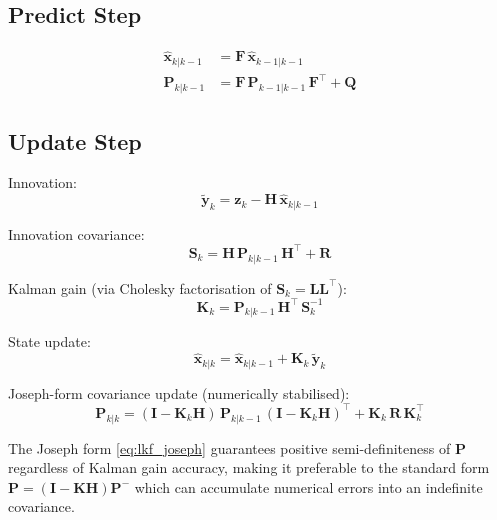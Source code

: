 \documentclass[12pt, a4paper]{article}
\begin{document}
\subsection{Predict Step}

\begin{align}
\hat{\mathbf{x}}_{k|k-1} &= \mathbf{F}\,\hat{\mathbf{x}}_{k-1|k-1} \label{eq:lkf_pred_x}\\
\mathbf{P}_{k|k-1} &= \mathbf{F}\,\mathbf{P}_{k-1|k-1}\,\mathbf{F}^\top + \mathbf{Q} \label{eq:lkf_pred_P}
\end{align}

\subsection{Update Step}

Innovation:
\begin{equation}
\tilde{\mathbf{y}}_k = \mathbf{z}_k - \mathbf{H}\,\hat{\mathbf{x}}_{k|k-1}
\label{eq:lkf_innov}
\end{equation}

Innovation covariance:
\begin{equation}
\mathbf{S}_k = \mathbf{H}\,\mathbf{P}_{k|k-1}\,\mathbf{H}^\top + \mathbf{R}
\label{eq:lkf_S}
\end{equation}

Kalman gain (via Cholesky factorisation of $\mathbf{S}_k = \mathbf{L}\mathbf{L}^\top$):
\begin{equation}
\mathbf{K}_k = \mathbf{P}_{k|k-1}\,\mathbf{H}^\top\,\mathbf{S}_k^{-1}
\label{eq:lkf_K}
\end{equation}

State update:
\begin{equation}
\hat{\mathbf{x}}_{k|k} = \hat{\mathbf{x}}_{k|k-1} + \mathbf{K}_k\,\tilde{\mathbf{y}}_k
\label{eq:lkf_update_x}
\end{equation}

Joseph-form covariance update (numerically stabilised):
\begin{equation}
\mathbf{P}_{k|k} = (\mathbf{I} - \mathbf{K}_k\mathbf{H})\,\mathbf{P}_{k|k-1}\,(\mathbf{I} - \mathbf{K}_k\mathbf{H})^\top + \mathbf{K}_k\,\mathbf{R}\,\mathbf{K}_k^\top
\label{eq:lkf_joseph}
\end{equation}

The Joseph form \eqref{eq:lkf_joseph} guarantees positive semi-definiteness of $\mathbf{P}$ regardless of Kalman gain accuracy, making it preferable to the standard form $\mathbf{P} = (\mathbf{I}-\mathbf{K}\mathbf{H})\mathbf{P}^-$ which can accumulate numerical errors into an indefinite covariance.
\end{document}
